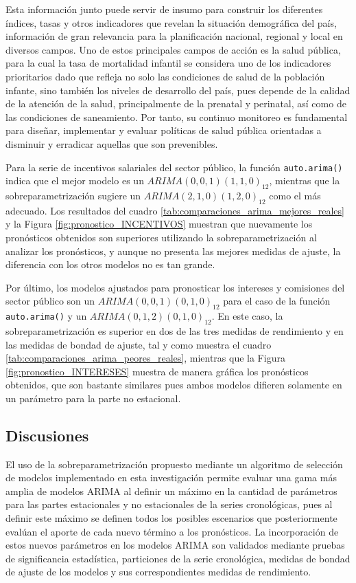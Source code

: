 \documentclass[
]{article}
\begin{document}
Esta información junto puede servir de insumo para construir los
diferentes índices, tasas y otros indicadores que revelan la situación
demográfica del país, información de gran relevancia para la
planificación nacional, regional y local en diversos campos. Uno de
estos principales campos de acción es la salud pública, para la cual la
tasa de mortalidad infantil se considera uno de los indicadores
prioritarios dado que refleja no solo las condiciones de salud de la
población infante, sino también los niveles de desarrollo del país, pues
depende de la calidad de la atención de la salud, principalmente de la
prenatal y perinatal, así como de las condiciones de saneamiento. Por
tanto, su continuo monitoreo es fundamental para diseñar, implementar y
evaluar políticas de salud pública orientadas a disminuir y erradicar
aquellas que son prevenibles.

Para la serie de incentivos salariales del sector público, la función
\texttt{auto.arima()} indica que el mejor modelo es un
\(ARIMA(0,0,1)(1,1,0)_{12}\), mientras que la sobreparametrización
sugiere un \(ARIMA(2,1,0)(1,2,0)_{12}\) como el más adecuado. Los
resultados del cuadro \ref{tab:comparaciones_arima_mejores_reales} y la
Figura \ref{fig:pronostico_INCENTIVOS} muestran que nuevamente los
pronósticos obtenidos son superiores utilizando la sobreparametrización
al analizar los pronósticos, y aunque no presenta las mejores medidas de
ajuste, la diferencia con los otros modelos no es tan grande.

Por último, los modelos ajustados para pronosticar los intereses y
comisiones del sector público son un \(ARIMA(0,0,1)(0,1,0)_{12}\) para
el caso de la función \texttt{auto.arima()} y un
\(ARIMA(0,1,2)(0,1,0)_{12}\). En este caso, la sobreparametrización es
superior en dos de las tres medidas de rendimiento y en las medidas de
bondad de ajuste, tal y como muestra el cuadro
\ref{tab:comparaciones_arima_peores_reales}, mientras que la Figura
\ref{fig:pronostico_INTERESES} muestra de manera gráfica los pronósticos
obtenidos, que son bastante similares pues ambos modelos difieren
solamente en un parámetro para la parte no estacional.

\subsection{Discusiones}

El uso de la sobreparametrización propuesto mediante un algoritmo de
selección de modelos implementado en esta investigación permite evaluar
una gama más amplia de modelos ARIMA al definir un máximo en la cantidad
de parámetros para las partes estacionales y no estacionales de la
series cronológicas, pues al definir este máximo se definen todos los
posibles escenarios que posteriormente evalúan el aporte de cada nuevo
término a los pronósticos. La incorporación de estos nuevos parámetros
en los modelos ARIMA son validados mediante pruebas de significancia
estadística, particiones de la serie cronológica, medidas de bondad de
ajuste de los modelos y sus correspondientes medidas de rendimiento.
\end{document}
